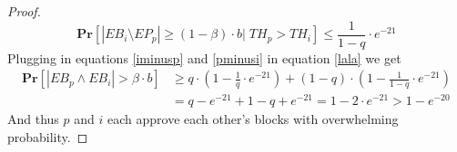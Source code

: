 \begin{proof}
\begin{equation}\label{iminusp}
\textbf{Pr}[|EB_i\setminus EP_p|\geq (1-\beta) \cdot b |\;TH_p> TH_i]\leq
\frac{1}{1-q}\cdot e^{-21}
\end{equation}
Plugging in equations \ref{iminusp} and \ref{pminusi} in equation \ref{lala} we get
\begin{equation}\begin{split}\label{lolo}
\textbf{Pr}[|EB_p\wedge  EB_i|>\beta \cdot b ]&\geq
q\cdot (1-\frac{1}{q}\cdot e^{-21})+(1-q)\cdot (1-\frac{1}{1-q}\cdot e^{-21})\\
&=q-e^{-21}+1-q+e^{-21}=1-2\cdot e^{-21}>1-e^{-20}
\end{split}\end{equation}
And thus $p$ and $i$ each approve each other's blocks with overwhelming probability.
\end{proof}